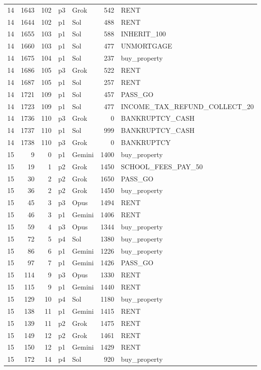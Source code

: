 \begin{longtable}{r r r l l r L{2.2in}}
14 & 1643 & 102 & p3 & Grok & 542 & RENT \\
14 & 1644 & 102 & p1 & Sol & 488 & RENT \\
14 & 1655 & 103 & p1 & Sol & 588 & INHERIT\_100 \\
14 & 1660 & 103 & p1 & Sol & 477 & UNMORTGAGE \\
14 & 1675 & 104 & p1 & Sol & 237 & buy\_property \\
14 & 1686 & 105 & p3 & Grok & 522 & RENT \\
14 & 1687 & 105 & p1 & Sol & 257 & RENT \\
14 & 1721 & 109 & p1 & Sol & 457 & PASS\_GO \\
14 & 1723 & 109 & p1 & Sol & 477 & INCOME\_TAX\_REFUND\_COLLECT\_20 \\
14 & 1736 & 110 & p3 & Grok & 0 & BANKRUPTCY\_CASH \\
14 & 1737 & 110 & p1 & Sol & 999 & BANKRUPTCY\_CASH \\
14 & 1738 & 110 & p3 & Grok & 0 & BANKRUPTCY \\
15 & 9 & 0 & p1 & Gemini & 1400 & buy\_property \\
15 & 19 & 1 & p2 & Grok & 1450 & SCHOOL\_FEES\_PAY\_50 \\
15 & 30 & 2 & p2 & Grok & 1650 & PASS\_GO \\
15 & 36 & 2 & p2 & Grok & 1450 & buy\_property \\
15 & 45 & 3 & p3 & Opus & 1494 & RENT \\
15 & 46 & 3 & p1 & Gemini & 1406 & RENT \\
15 & 59 & 4 & p3 & Opus & 1344 & buy\_property \\
15 & 72 & 5 & p4 & Sol & 1380 & buy\_property \\
15 & 86 & 6 & p1 & Gemini & 1226 & buy\_property \\
15 & 97 & 7 & p1 & Gemini & 1426 & PASS\_GO \\
15 & 114 & 9 & p3 & Opus & 1330 & RENT \\
15 & 115 & 9 & p1 & Gemini & 1440 & RENT \\
15 & 129 & 10 & p4 & Sol & 1180 & buy\_property \\
15 & 138 & 11 & p1 & Gemini & 1415 & RENT \\
15 & 139 & 11 & p2 & Grok & 1475 & RENT \\
15 & 149 & 12 & p2 & Grok & 1461 & RENT \\
15 & 150 & 12 & p1 & Gemini & 1429 & RENT \\
15 & 172 & 14 & p4 & Sol & 920 & buy\_property \\

\end{longtable}
